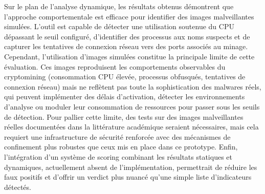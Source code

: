 Sur le plan de l'analyse dynamique, les résultats obtenus démontrent que l'approche comportementale est efficace pour identifier des images malveillantes simulées. L'outil est capable de détecter une utilisation soutenue du CPU dépassant le seuil configuré, d'identifier des processus aux noms suspects et de capturer les tentatives de connexion réseau vers des ports associés au minage. Cependant, l'utilisation d'images simulées constitue la principale limite de cette évaluation. Ces images reproduisent les comportements observables du cryptomining (consommation CPU élevée, processus obfusqués, tentatives de connexion réseau) mais ne reflètent pas toute la sophistication des malwares réels, qui peuvent implémenter des délais d'activation, détecter les environnements d'analyse ou moduler leur consommation de ressources pour passer sous les seuils de détection. Pour pallier cette limite, des tests sur des images malveillantes réelles documentées dans la littérature académique seraient nécessaires, mais cela requiert une infrastructure de sécurité renforcée avec des mécanismes de confinement plus robustes que ceux mis en place dans ce prototype. Enfin, l'intégration d'un système de scoring combinant les résultats statiques et dynamiques, actuellement absent de l'implémentation, permettrait de réduire les faux positifs et d'offrir un verdict plus nuancé qu'une simple liste d'indicateurs détectés.

